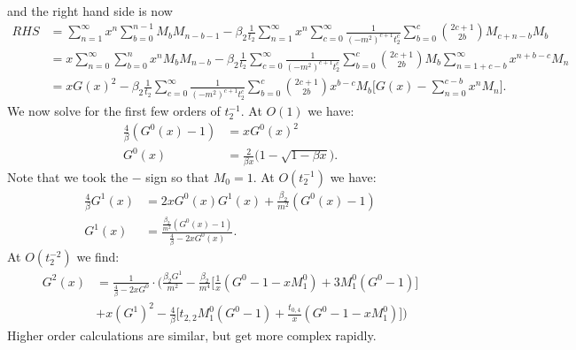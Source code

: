 \documentclass[10pt]{article}
\theoremstyle{plain}
\theoremstyle{definition}
\theoremstyle{plain}
\begin{document}
and the right hand side is now
\begin{align*}
	RHS &=  \sum_{n=1}^\infty x^n \sum_{b=0}^{n-1}M_{b}M_{n-b-1}  - \beta_2\frac{1}{t_2}\sum_{n=1}^\infty x^n\sum_{c=0}^\infty\frac{1}{(-m^2)^{c+1}t_2^c}\sum_{b=0}^{c}{2c+1\choose 2b}  M_{c+n-b}M_{b}  \\
	&= x\sum_{n=0}^\infty  \sum_{b=0}^n x^nM_bM_{n-b} - \beta_2\frac{1}{t_2}\sum_{c=0}^\infty \frac{1}{(-m^2)^{c+1}t_2^c}\sum_{b=0}^c {2c+1\choose 2b} M_b \sum_{n=1+c-b}^\infty x^{n+b-c}M_n \\
	&= xG(x)^2 - \beta_2\frac{1}{t_2}\sum_{c=0}^\infty \frac{1}{(-m^2)^{c+1}t_2^c}\sum_{b=0}^c {2c+1\choose 2b} x^{b-c} M_b \bigg[ G(x)-\sum_{n=0}^{c-b}x^n M_n \bigg].
\end{align*}
We now solve for the first few orders of $t_2^{-1}$. At $O(1)$ we have:
\begin{align}
	\frac{4}{\beta}(G^0(x)-1)&=xG^0(x)^2 \nonumber\\ G^0(x) &= \frac{2}{\beta x} \bigg(1 - \sqrt{1-\beta x}\bigg). \label{o1eqn}
\end{align}
Note that we took the $-$ sign so that $M_0=1$. At $O(t_2^{-1})$ we have:
\begin{align}
	\frac{4}{\beta} G^1(x) &= 2xG^0(x)G^1(x) + \frac{\beta_2}{m^2}(G^0(x)-1) \nonumber\\
	G^1(x) &= \frac{\frac{\beta_2}{ m^2}(G^0(x)-1)}{\frac{4}{\beta}-2xG^0(x)}.\label{o2eqn}
\end{align}
At $O(t_2^{-2})$ we find:
\begin{align*}
	G^2(x) &= \frac{1}{\frac{4}{\beta}-2xG^0}\cdot \bigg( \frac{\beta_2G^1}{m^2} - \frac{\beta_2}{m^4}\bigg[ \frac{1}{x}(G^0-1-xM_1^0) + 3M_1^0(G^0-1)\bigg]  \\ &+ x(G^1)^2 -\frac{4}{\beta}\bigg[ t_{2,2}M_1^0(G^0-1) +\frac{t_{0,4}}{x}(G^0-1-xM_1^0) \bigg]\bigg) 
\end{align*}
Higher order calculations are similar, but get more complex rapidly. \\
\end{document}
